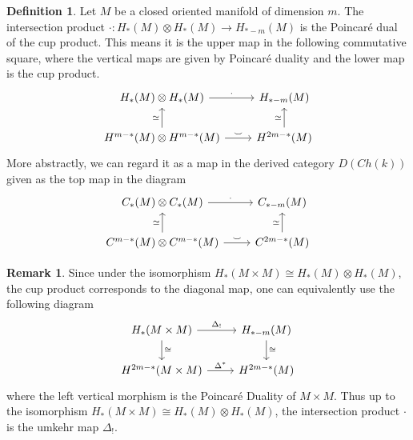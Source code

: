 \documentclass{scrartcl}
\theoremstyle{plain}
\theoremstyle{definition}
\newtheorem{definition}[theorem]{Definition}
\newtheorem{remark}[theorem]{Remark}
\newcommand{\cupp}{\mathbin{\smile}}
\newcommand{\iso}{\cong}
\newcommand{\quiso}{\simeq}
\begin{document}
\begin{definition}\label{def:loop-product-classical}
    Let $M$ be a closed oriented manifold of dimension $m$. 
The intersection product $\cdot\colon H_*(M)\otimes H_*(M)\to H_{*-m}(M)$ is the Poincaré dual of the cup product. This means it is the upper map in the following commutative square, where the vertical maps are given by Poincaré duality and the lower map is the cup product.
\begin{equation}
    \begin{tikzcd}
        H_*(M) \otimes H_*(M)  \rar["\cdot"] & H_{*-m}(M)  \\
        H^{m-*}(M)\otimes H^{m-*}(M) \uar["\quiso"] \rar["\cupp"] &  H^{2m-*}(M) \uar["\quiso"]
    \end{tikzcd}
\end{equation}
More abstractly, we can regard it as a map in the derived category $D(Ch(k))$ given as the top map in the diagram
\begin{equation}
    \begin{tikzcd}
        C_*(M) \otimes C_*(M)  \rar["\cdot"] & C_{*-m}(M)  \\
        C^{m-*}(M)\otimes C^{m-*}(M) \uar["\quiso"]\rar["\cupp"] &  C^{2m-*}(M) \uar["\quiso"]
    \end{tikzcd}
\end{equation}
\end{definition}
\begin{remark}
Since under the isomorphism $H_*(M\times M) \iso H_*(M)\otimes H_*(M)$, the cup product corresponds to the diagonal map, one can equivalently use the following diagram
\begin{equation}
    \begin{tikzcd}
        H_*(M\times M) \dar["\iso"] \rar["\Delta_!"] & H_{*-m}(M) \dar["\iso"] \\
        H^{2m-*}(M\times M) \rar["\Delta^*"] & H^{2m-*}(M)
    \end{tikzcd}
\end{equation}
where the left vertical morphism is the Poincaré Duality of $M\times M$. Thus up to the isomorphism $H_*(M\times M) \iso H_*(M)\otimes H_*(M)$, the intersection product $\cdot$ is the umkehr map $\Delta_!$.
\end{remark}
\end{document}
